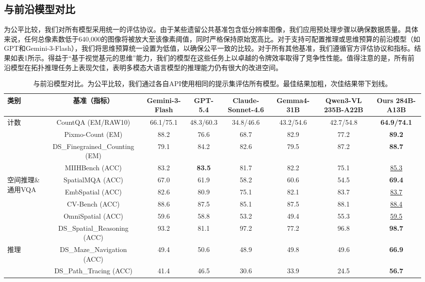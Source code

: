 \documentclass[11pt,a4paper]{article}
\begin{document}
\subsection{与前沿模型对比}

为公平比较，我们对所有模型采用统一的评估协议。由于某些遗留公共基准包含低分辨率图像，我们应用预处理步骤以确保数据质量。具体来说，任何总像素数低于640,000的图像将被放大至该像素阈值，同时严格保持原始宽高比。对于支持可配置推理或思维预算的前沿模型（如GPT和Gemini-3-Flash），我们将思维预算统一设置为低值，以确保公平一致的比较。对于所有其他基准，我们遵循官方评估协议和指标。结果如表1所示。得益于“基于视觉基元的思维”能力，我们的模型在这些任务上以卓越的令牌效率取得了竞争性性能。值得注意的是，所有前沿模型在拓扑推理任务上表现欠佳，表明多模态大语言模型的推理能力仍有很大的改进空间。

\begin{table}[H]
\centering
\caption{与前沿模型对比。为公平比较，我们通过各自API使用相同的提示集评估所有模型。最佳结果加粗，次佳结果带下划线。}
\label{tab:results}
\footnotesize
\renewcommand{\arraystretch}{1.1}
\begin{tabular}{lccccccc} 
\toprule
\textbf{类别} & \textbf{基准（指标）} & \textbf{Gemini-3-Flash} & \textbf{GPT-5.4} & \textbf{Claude-Sonnet-4.6} & \textbf{Gemma4-31B} & \textbf{Qwen3-VL 235B-A22B} & \textbf{Ours 284B-A13B} \\
\midrule
\multirow{4}{*}{计数} 
 & CountQA (EM/RAW10) & 66.1/75.1 & 48.3/60.3 & 34.8/46.6 & 43.2/54.6 & 42.7/54.8 & \textbf{64.9/74.1} \\
 & Pixmo-Count (EM) & 88.2 & 76.6 & 68.7 & 82.9 & 77.2 & \textbf{89.2} \\
 & DS\_Finegrained\_Counting (EM) & 79.1 & 84.2 & 82.6 & 79.5 & 87.2 & \textbf{88.7} \\
 & MIIHBench (ACC) & 83.2 & \textbf{83.5} & 81.7 & 82.2 & 75.1 & \underline{85.3} \\
\midrule
\multirow{5}{*}{空间推理\&通用VQA} 
 & SpatialMQA (ACC) & 67.0 & 61.9 & 58.2 & 60.6 & 54.5 & \textbf{69.4} \\
 & EmbSpatial (ACC) & 82.6 & 80.9 & 75.1 & 82.1 & 83.7 & \underline{83.7} \\
 & CV-Bench (ACC) & 88.6 & 87.5 & 85.1 & 87.5 & 88.1 & \underline{88.4} \\
 & OmniSpatial (ACC) & 59.6 & 58.8 & 53.2 & 49.4 & 55.3 & \underline{59.5} \\
 & DS\_Spatial\_Reasoning (ACC) & 93.2 & 81.1 & 97.2 & 77.2 & 96.8 & \textbf{98.7} \\
\midrule
\multirow{2}{*}{推理} 
 & DS\_Maze\_Navigation (ACC) & 49.4 & 50.6 & 48.9 & 49.8 & 49.6 & \textbf{66.9} \\
 & DS\_Path\_Tracing (ACC) & 41.4 & 46.5 & 30.6 & 33.9 & 24.5 & \textbf{56.7} \\
\bottomrule
\end{tabular}
\end{table}
\end{document}
